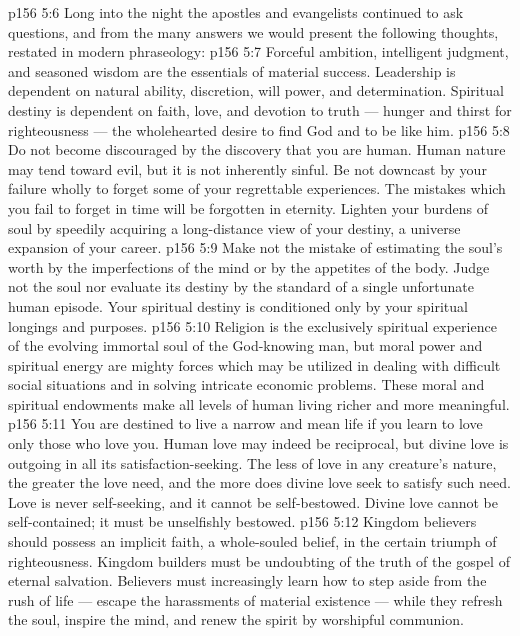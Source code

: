 \vs p156 5:6 Long into the night the apostles and evangelists continued to ask questions, and from the many answers we would present the following thoughts, restated in modern phraseology:
\vs p156 5:7 Forceful ambition, intelligent judgment, and seasoned wisdom are the essentials of material success. Leadership is dependent on natural ability, discretion, will power, and determination. Spiritual destiny is dependent on faith, love, and devotion to truth --- hunger and thirst for righteousness --- the wholehearted desire to find God and to be like him.
\vs p156 5:8 Do not become discouraged by the discovery that you are human. Human nature may tend toward evil, but it is not inherently sinful. Be not downcast by your failure wholly to forget some of your regrettable experiences. The mistakes which you fail to forget in time will be forgotten in eternity. Lighten your burdens of soul by speedily acquiring a long\hyp{}distance view of your destiny, a universe expansion of your career.
\vs p156 5:9 Make not the mistake of estimating the soul’s worth by the imperfections of the mind or by the appetites of the body. Judge not the soul nor evaluate its destiny by the standard of a single unfortunate human episode. Your spiritual destiny is conditioned only by your spiritual longings and purposes.
\vs p156 5:10 Religion is the exclusively spiritual experience of the evolving immortal soul of the God\hyp{}knowing man, but moral power and spiritual energy are mighty forces which may be utilized in dealing with difficult social situations and in solving intricate economic problems. These moral and spiritual endowments make all levels of human living richer and more meaningful.
\vs p156 5:11 You are destined to live a narrow and mean life if you learn to love only those who love you. Human love may indeed be reciprocal, but divine love is outgoing in all its satisfaction\hyp{}seeking. The less of love in any creature’s nature, the greater the love need, and the more does divine love seek to satisfy such need. Love is never self\hyp{}seeking, and it cannot be self\hyp{}bestowed. Divine love cannot be self\hyp{}contained; it must be unselfishly bestowed.
\vs p156 5:12 Kingdom believers should possess an implicit faith, a whole\hyp{}souled belief, in the certain triumph of righteousness. Kingdom builders must be undoubting of the truth of the gospel of eternal salvation. Believers must increasingly learn how to step aside from the rush of life --- escape the harassments of material existence --- while they refresh the soul, inspire the mind, and renew the spirit by worshipful communion.
